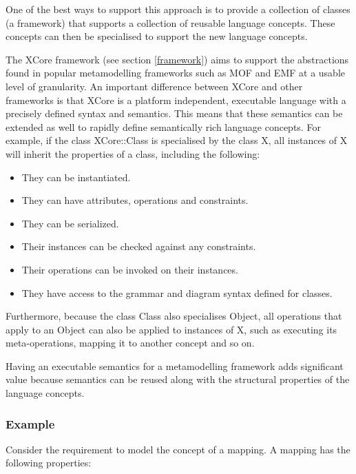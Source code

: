 One of the best ways to support this approach is to provide a
collection of classes (a framework) that supports a collection of
reusable language concepts. These concepts can then be specialised
to support the new language concepts.

The XCore framework (see section \ref{framework}) aims to support
the abstractions found in popular metamodelling frameworks such as
MOF \cite{mofspec} and EMF \cite{emf} at a usable level of
granularity. An important difference between XCore and other
frameworks is that XCore is a platform independent, executable
language with a precisely defined syntax and semantics. This means
that these semantics can be extended as well to rapidly define
semantically rich language concepts. For example, if the class
XCore::Class is specialised by the class X, all instances of X
will inherit the properties of a class, including the following:

\begin{itemize}
\item They can be instantiated. \item They can have attributes,
operations and constraints. \item They can be serialized. \item
Their instances can be checked against any constraints. \item
Their operations can be invoked on their instances. \item They
have access to the grammar and diagram syntax defined for classes.

\end{itemize}

Furthermore, because the class Class also specialises Object, all
operations that apply to an Object can also be applied to
instances of X, such as executing its meta-operations, mapping it
to another concept and so on.

Having an executable semantics for a metamodelling framework adds
significant value because semantics can be reused along with the
structural properties of the language concepts.

\subsubsection{Example}

Consider the requirement to model the concept of a mapping. A
mapping has the following properties:

